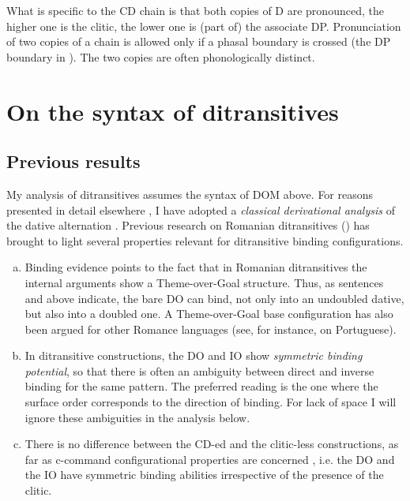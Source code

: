 \documentclass[output=paper,colorlinks,citecolor=brown,nonflat]{langsci/langscibook}
\begin{document}
What is specific to the CD chain is that both copies of D are pronounced, the higher one is the clitic, the lower one is (part of) the associate DP. Pronunciation of two copies of a chain is allowed only if a phasal boundary is crossed (the DP boundary in ). The two copies are often phonologically distinct.

\section{On the syntax of ditransitives} %

\subsection{{Previous} {results}}%

My analysis of ditransitives assumes the syntax of DOM above. For reasons presented in detail elsewhere \citep{CornilescuDinuTigău2017DOC}, I have adopted a \textit{classical derivational analysis} of the dative alternation \citep{HaradaLarson2009, OrmazabalRomero2017}. Previous research on Romanian ditransitives (\citealt{DiaconescuRivero2007, CornilescuDinuTigău2017DOC}) has brought to light several properties relevant for ditransitive binding configurations.

\begin{enumerate}[a.]
	\item Binding evidence points to the fact that in Romanian ditransitives the internal arguments show a Theme-over-Goal structure. Thus, as sentences  and  above indicate, the bare DO can bind, not only into an undoubled dative, but also into a doubled one. A Theme-over-Goal base configuration has also been argued for other Romance languages (see, for instance,  on Portuguese).

	\item In ditransitive constructions, the DO and IO show \textit{symmetric binding potential}, so that there is often an ambiguity between direct and inverse binding for the same pattern. The preferred reading is the one where the surface order corresponds to the direction of binding. For lack of space I will ignore these ambiguities in the analysis below.

	\item There is no difference between the CD-ed and the clitic-less constructions, as far as c-command configurational properties are concerned \citep{CornilescuDinuTigău2017DOC}, i.e. the DO and the IO have symmetric binding abilities irrespective of the presence of the clitic.
\end{enumerate}
\end{document}
